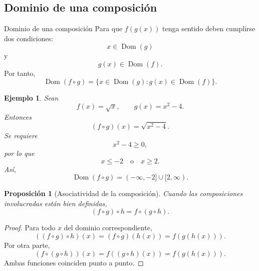 \documentclass[aspectratio=169,10pt]{beamer}
\newtheorem{proposicion}{Proposición}
\newtheorem{ejemplo}{Ejemplo}
\newcommand{\Dom}{\operatorname{Dom}}
\begin{document}
\subsection{Dominio de una composición}
\begin{frame}{Dominio de una composición}
Para que $f(g(x))$ tenga sentido deben cumplirse dos condiciones:
\[
x\in\Dom(g)
\]
y
\[
g(x)\in\Dom(f).
\]
Por tanto,
\[
\Dom(f\circ g)
=
\{x\in\Dom(g):g(x)\in\Dom(f)\}.
\]

\begin{ejemplo}
Sean
\[
f(x)=\sqrt{x},\qquad g(x)=x^2-4.
\]
Entonces
\[
(f\circ g)(x)=\sqrt{x^2-4}.
\]
Se requiere
\[
x^2-4\geq0,
\]
por lo que
\[
x\leq-2\quad\text{o}\quad x\geq2.
\]
Así,
\[
\Dom(f\circ g)=(-\infty,-2]\cup[2,\infty).
\]
\end{ejemplo}

\begin{proposicion}[Asociatividad de la composición]
Cuando las composiciones involucradas están bien definidas,
\[
(f\circ g)\circ h=f\circ(g\circ h).
\]
\end{proposicion}

\begin{proof}
Para todo $x$ del dominio correspondiente,
\[
((f\circ g)\circ h)(x)
=(f\circ g)(h(x))
=f(g(h(x))).
\]
Por otra parte,
\[
(f\circ(g\circ h))(x)
=f((g\circ h)(x))
=f(g(h(x))).
\]
Ambas funciones coinciden punto a punto.
\end{proof}

\end{frame}
\end{document}
